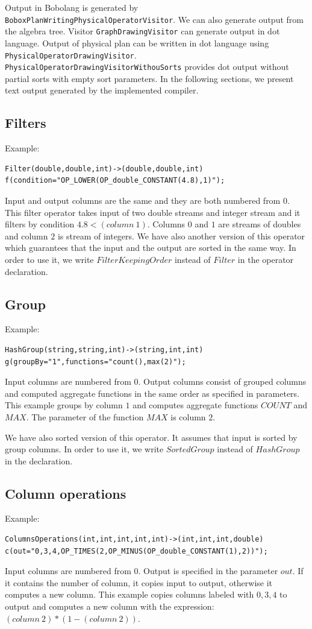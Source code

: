  Output in Bobolang is generated by \texttt{Bobox\-Plan\-Writing\-Physical\-Operator\-Vi\-si\-tor}. We can also generate output from the algebra tree. Visitor \texttt{Graph\-Drawing\-Visitor} can generate output in dot language. Output of physical plan can be written in dot language using \texttt{Physical\-Operator\-Drawing\-Visitor}. \texttt{Physical\-Operator\-Drawing\-Visitor\-WithouSorts} provides dot output without partial sorts with empty sort parameters. In the following sections, we present text output generated by the implemented compiler.

\subsection{Filters}
Example: 
\begin{lstlisting}
Filter(double,double,int)->(double,double,int)
f(condition="OP_LOWER(OP_double_CONSTANT(4.8),1)"); 
\end{lstlisting}

Input and output columns are the same and they are both numbered from $0$.
This filter operator takes input of two double streams and integer stream and it filters by condition $4.8<(column~1)$. Columns $0$ and $1$ are streams of doubles and column $2$ is stream of integers. We have also another version of this operator which guarantees that the input and the output are sorted in the same way. In order to use it, we write $FilterKeepingOrder$ instead of $Filter$ in the operator declaration. 

\subsection{Group}
Example: 
\begin{lstlisting}
HashGroup(string,string,int)->(string,int,int)
g(groupBy="1",functions="count(),max(2)");
\end{lstlisting}
Input columns are numbered from $0$. Output columns consist of grouped columns and computed aggregate functions in the same order as specified in parameters. 
This example groups by column $1$ and computes aggregate functions $COUNT$ and $MAX$. The parameter of the function $MAX$ is column $2$. 

We have also sorted version of this operator. It assumes that input is sorted by group columns. In order to use it, we write $SortedGroup$ instead of $HashGroup$ in the declaration.

\subsection{Column operations}
Example: 
\begin{lstlisting} 
ColumnsOperations(int,int,int,int,int)->(int,int,int,double)
c(out="0,3,4,OP_TIMES(2,OP_MINUS(OP_double_CONSTANT(1),2))"); 
\end{lstlisting}
Input columns are numbered from $0$. Output is specified in the parameter $out$. If it contains the number of column, it copies input to output, otherwise it computes a new column. 
This example copies columns labeled with $0,3,4$ to output and computes a new column with the expression: $(column~2)*(1-(column~2))$.

